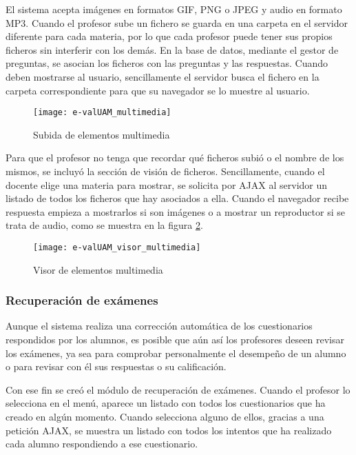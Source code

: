 El sistema acepta imágenes en formatos GIF, PNG o JPEG y audio en formato MP3. Cuando el profesor sube un fichero se guarda en una carpeta en el servidor diferente para cada materia, por lo que cada profesor puede tener sus propios ficheros sin interferir con los demás. En la base de datos, mediante el gestor de preguntas, se asocian los ficheros con las preguntas y las respuestas. Cuando deben mostrarse al usuario, sencillamente el servidor busca el fichero en la carpeta correspondiente para que su navegador se lo muestre al usuario.

\begin{figure}[htp!]
	\centering
	\texttt{[image: e-valUAM\_multimedia]}
	\caption{Subida de elementos multimedia}
	\label{fig:e-valUAM multimedia profesor}
\end{figure}

Para que el profesor no tenga que recordar qué ficheros subió o el nombre de los mismos, se incluyó la sección de visión de ficheros. Sencillamente, cuando el docente elige una materia para mostrar, se solicita por AJAX al servidor un listado de todos los ficheros que hay asociados a ella. Cuando el navegador recibe respuesta empieza a mostrarlos si son imágenes o a mostrar un reproductor si se trata de audio, como se muestra en la figura \ref{fig:e-valUAM visor multimedia profesor}.

\begin{figure}[htp!]
	\centering
	\texttt{[image: e-valUAM\_visor\_multimedia]}
	\caption{Visor de elementos multimedia}
	\label{fig:e-valUAM visor multimedia profesor}
\end{figure}

\subsubsection{Recuperación de exámenes}

Aunque el sistema realiza una corrección automática de los cuestionarios respondidos por los alumnos, es posible que aún así los profesores deseen revisar los exámenes, ya sea para comprobar personalmente el desempeño de un alumno o para revisar con él sus respuestas o su calificación.

Con ese fin se creó el módulo de recuperación de exámenes. Cuando el profesor lo selecciona en el menú, aparece un listado con todos los cuestionarios que ha creado en algún momento. Cuando selecciona alguno de ellos, gracias a una petición AJAX, se muestra un listado con todos los intentos que ha realizado cada alumno respondiendo a ese cuestionario.

